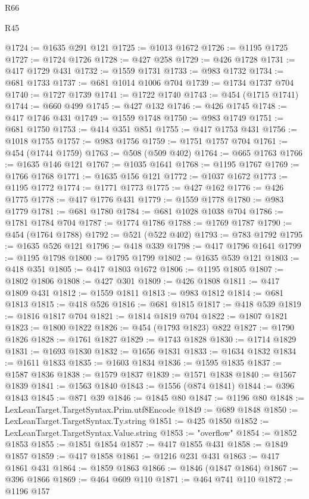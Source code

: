 \begin{lexlean}{R66}
\begin{lexlean}{R45}
\begin{coremodule}
{{{{{{{{{{{{{{{{{{{{{{{{{{{{{{{{{{{{{{{{{{{{{{{{{{{{{{{{{{{{{{{{{{{{{{{{{{{{{{{{{{{{{{{{{{{@1724 := @1635 @291 @121
@1725 := @1013 @1672
@1726 := @1195 @1725
@1727 := @1724 @1726
@1728 := @427 @258
@1729 := @426 @1728
@1731 := @417 @1729 @431
@1732 := @1559 @1731
@1733 := @983 @1732
@1734 := @681 @1733
@1737 := @681 @1014 @1006 @704
@1739 := @1734 @1737 @704
@1740 := @1727 @1739
@1741 := @1722 @1740
@1743 := @454 (@1715 @1741)
@1744 := @660 @499
@1745 := @427 @132
@1746 := @426 @1745
@1748 := @417 @1746 @431
@1749 := @1559 @1748
@1750 := @983 @1749
@1751 := @681 @1750
@1753 := @414 @351 @851
@1755 := @417 @1753 @431
@1756 := @1018 @1755
@1757 := @983 @1756
@1759 := @1751 @1757 @704
@1761 := @454 (@1744 @1759)
@1763 := @508 (@509 @402)
@1764 := @665 @1763
@1766 := @1635 @146 @121
@1767 := @1035 @1641
@1768 := @1195 @1767
@1769 := @1766 @1768
@1771 := @1635 @156 @121
@1772 := @1037 @1672
@1773 := @1195 @1772
@1774 := @1771 @1773
@1775 := @427 @162
@1776 := @426 @1775
@1778 := @417 @1776 @431
@1779 := @1559 @1778
@1780 := @983 @1779
@1781 := @681 @1780
@1784 := @681 @1028 @1038 @704
@1786 := @1781 @1784 @704
@1787 := @1774 @1786
@1788 := @1769 @1787
@1790 := @454 (@1764 @1788)
@1792 := @521 (@522 @402)
@1793 := @783 @1792
@1795 := @1635 @526 @121
@1796 := @418 @339
@1798 := @417 @1796 @1641
@1799 := @1195 @1798
@1800 := @1795 @1799
@1802 := @1635 @539 @121
@1803 := @418 @351
@1805 := @417 @1803 @1672
@1806 := @1195 @1805
@1807 := @1802 @1806
@1808 := @427 @301
@1809 := @426 @1808
@1811 := @417 @1809 @431
@1812 := @1559 @1811
@1813 := @983 @1812
@1814 := @681 @1813
@1815 := @418 @526
@1816 := @681 @1815
@1817 := @418 @539
@1819 := @1816 @1817 @704
@1821 := @1814 @1819 @704
@1822 := @1807 @1821
@1823 := @1800 @1822
@1826 := @454 (@1793 @1823) @822
@1827 := @1790 @1826
@1828 := @1761 @1827
@1829 := @1743 @1828
@1830 := @1714 @1829
@1831 := @1693 @1830
@1832 := @1656 @1831
@1833 := @1634 @1832
@1834 := @1611 @1833
@1835 := @1603 @1834
@1836 := @1595 @1835
@1837 := @1587 @1836
@1838 := @1579 @1837
@1839 := @1571 @1838
@1840 := @1567 @1839
@1841 := @1563 @1840
@1843 := @1556 (@874 @1841)
@1844 := @396 @1843
@1845 := @871 @39
@1846 := @1845 @80
@1847 := @1196 @80
@1848 := LexLeanTarget.TargetSyntax.Prim.utf8Encode
@1849 := @689 @1848
@1850 := LexLeanTarget.TargetSyntax.Ty.string
@1851 := @425 @1850
@1852 := LexLeanTarget.TargetSyntax.Value.string
@1853 := "overflow"
@1854 := @1852 @1853
@1855 := @1851 @1854
@1857 := @417 @1855 @431
@1858 := @1849 @1857
@1859 := @417 @1858
@1861 := @1216 @231 @431
@1863 := @417 @1861 @431
@1864 := @1859 @1863
@1866 := @1846 (@1847 @1864)
@1867 := @396 @1866
@1869 := @464 @609 @110
@1871 := @464 @741 @110
@1872 := @1196 @157
}}}}}}}}}}}}}}}}}}}}}}}}}}}}}}}}}}}}}}}}}}}}}}}}}}}}}}}}}}}}}}}}}}}}}}}}}}}}}}}}}}}}}}}}}}}
\end{coremodule}
\end{lexlean}
\end{lexlean}
